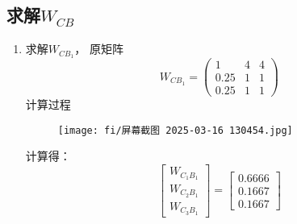 \documentclass{article}
\begin{document}
\subsection{求解$W_{CB}$}
\begin{enumerate}[(1)]
\item 求解$W_{CB_1}$，
    原矩阵
 \[
 W_{CB_1} = \begin{pmatrix}
 1 & 4 & 4 \\
 0.25 & 1  & 1 \\
 0.25 & 1  & 1
 \end{pmatrix}
 \]
 计算过程
 \begin{figure}[h]
    \centering
    \texttt{[image: fi/屏幕截图 2025-03-16 130454.jpg]}
 \end{figure}
 计算得：
 \begin{equation}
    \left[
    \begin{array}{c}
    W_{C_1B_1} \\
    W_{C_2B_1} \\
    W_{C_3B_1}
    \end{array}
    \right]
    =
    \left[
    \begin{array}{c}
    0.6666\\ 
    0.1667 \\
    0.1667
    \end{array}
    \right]
    \end{equation}


\end{enumerate}
\end{document}
